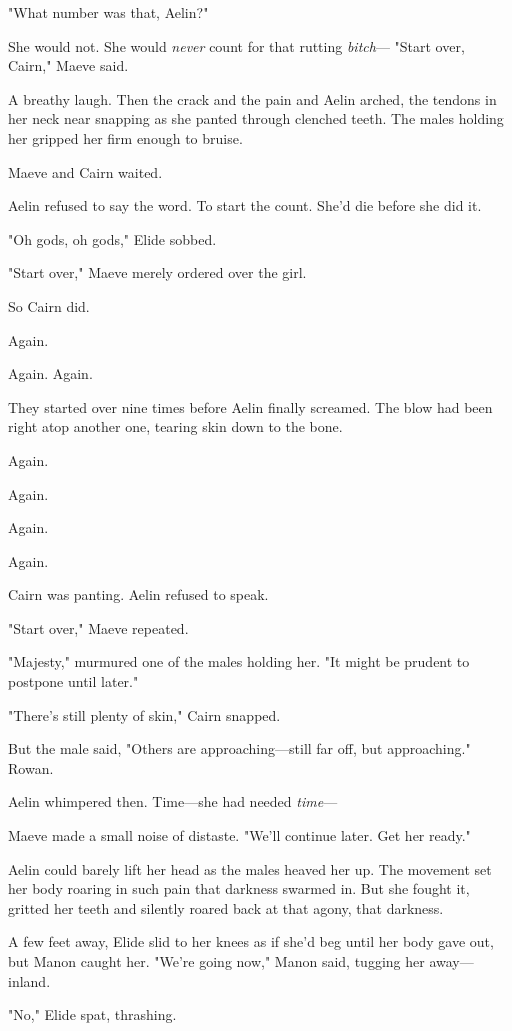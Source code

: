"What number was that, Aelin?"

She would not.
She would \emph{never} count for that rutting \emph{bitch}--- "Start over, Cairn," Maeve said.

A breathy laugh.
Then the crack and the pain and Aelin arched, the tendons in her neck near snapping as she panted through clenched teeth.
The males holding her gripped her firm enough to bruise.

Maeve and Cairn waited.

Aelin refused to say the word.
To start the count.
She'd die before she did it.

"Oh gods, oh gods," Elide sobbed.

"Start over," Maeve merely ordered over the girl.

So Cairn did.

Again.

Again.
Again.

They started over nine times before Aelin finally screamed.
The blow had been right atop another one, tearing skin down to the bone.

Again.

Again.

Again.

Again.

Cairn was panting.
Aelin refused to speak.

"Start over," Maeve repeated.

"Majesty," murmured one of the males holding her.
"It might be prudent to postpone until later."

"There's still plenty of skin," Cairn snapped.

But the male said, "Others are approaching---still far off, but approaching."
Rowan.

Aelin whimpered then.
Time---she had needed \emph{time}---

Maeve made a small noise of distaste.
"We'll continue later.
Get her ready."

Aelin could barely lift her head as the males heaved her up.
The movement set her body roaring in such pain that darkness swarmed in.
But she fought it, gritted her teeth and silently roared back at that agony, that darkness.

A few feet away, Elide slid to her knees as if she'd beg until her body gave out, but Manon caught her.
"We're going now," Manon said, tugging her away--- inland.

"No," Elide spat, thrashing.

